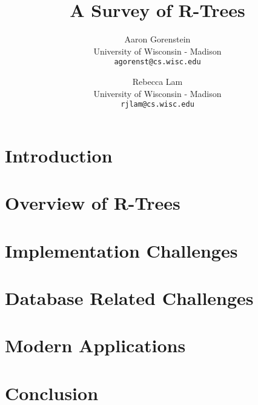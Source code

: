 \documentclass[10pt, twocolumn, draft]{article}
\title{A Survey of R-Trees}
\author{
	Aaron Gorenstein\\
	University of Wisconsin - Madison\\
	\texttt{agorenst@cs.wisc.edu}
	\and
	Rebecca Lam\\
	University of Wisconsin - Madison\\
	\texttt{rjlam@cs.wisc.edu}
}
\begin{document}
\maketitle
\thispagestyle{empty}



\section{Introduction}
\label{sec:intro}


\section{Overview of R-Trees}
\label{sec:overview}


\section{Implementation Challenges}
\label{sec:impchal}


\section{Database Related Challenges}
\label{sec:dbchal}


\section{Modern Applications}
\label{sec:apps}


\section{Conclusion}
\label{sec:conc}




\end{document}

